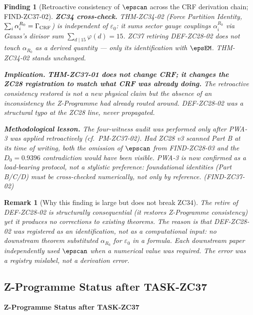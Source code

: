 \documentclass[12pt, a4paper]{article}
\newtheorem{remark}{Remark}[section]
\newtheorem{finding}{Finding}[section]
\begin{document}
\begin{finding}[Retroactive consistency of $\epscan$ across
  the CRF derivation chain; FIND-ZC37-02]
\medskip
\textbf{ZC34 cross-check.} THM-ZC34-02 (Force Partition
Identity, $\sum_i \alpha_i^{R_0} = \Gamma_{\rm CRF}$) is
independent of $\varepsilon_0$: it sums sector gauge couplings
$\alpha_i^{R_0}$ via Gauss's divisor sum
$\sum_{d \mid 15}\varphi(d) = 15$. ZC37 retiring DEF-ZC28-02
does not touch $\alpha_{R_0}$ as a derived quantity --- only
its identification with $\epsEM$. THM-ZC34-02 stands
unchanged.

\medskip
\textbf{Implication.}
\textbf{THM-ZC37-01 does not change CRF; it changes the ZC28
registration to match what CRF was already doing.} The
retroactive consistency restored is not a new physical claim
but the absence of an inconsistency the Z-Programme had
already routed around. DEF-ZC28-02 was a structural typo at
the ZC28 line, never propagated.

\medskip
\textbf{Methodological lesson.}
The four-witness audit was performed only after PWA-3 was
applied retroactively (cf.\ PM-ZC37-02). Had ZC28 v3
scanned Part B at its time of writing, both the omission of
$\epscan$ from FIND-ZC28-03 and the $D_0 = 0.9396$
contradiction would have been visible. PWA-3 is now confirmed
as a load-bearing protocol, not a stylistic preference:
foundational identities (Part B/C/D) must be cross-checked
\emph{numerically}, not only by reference.
\hfill\textup{(FIND-ZC37-02)}
\end{finding}

\begin{remark}[Why this finding is large but does not break ZC34]
The retire of DEF-ZC28-02 is structurally consequential
(it restores Z-Programme consistency) yet it produces
\emph{no} corrections to existing theorems. The reason is
that DEF-ZC28-02 was registered as an \emph{identification},
not as a \emph{computational input}: no downstream theorem
substituted $\alpha_{R_0}$ for $\varepsilon_0$ in a formula.
Each downstream paper independently used $\epscan$ when a
numerical value was required. The error was a registry
mislabel, not a derivation error.
\end{remark}

\subsection{Z-Programme Status after TASK-ZC37}
\label{sec:status}

{\small\color{crfgreen!20!black}\bfseries
Z-Programme Status after TASK-ZC37}
\vspace{2pt}
\end{document}
